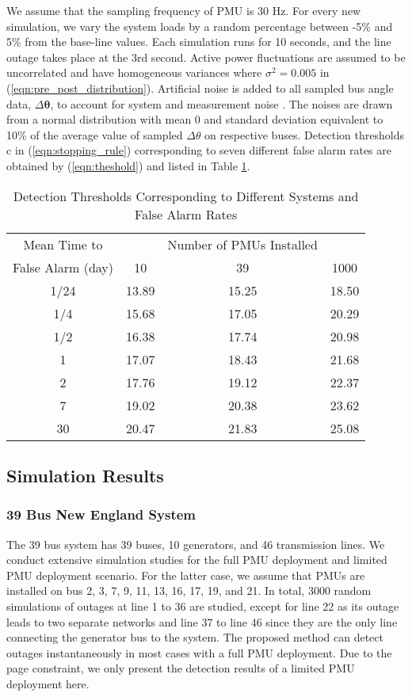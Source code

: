 We assume that the sampling frequency of PMU is 30 Hz. For every new simulation, we vary the system loads by a random percentage between -5\% and 5\% from the base-line values. Each simulation runs for 10 seconds, and the line outage takes place at the 3rd second. Active power fluctuations are assumed to be uncorrelated and have homogeneous variances where $\sigma^2 = 0.005$ in (\ref{eqn:pre_post_distribution}). Artificial noise is added to all sampled bus angle data, $\Delta \boldsymbol{\theta}$, to account for system and measurement noise \cite{Brown2016}. The noises are drawn from a normal distribution with mean $0$ and standard deviation equivalent to 10\% of the average value of sampled $\Delta{\theta}$ on respective buses. Detection thresholds c in (\ref{eqn:stopping_rule}) corresponding to seven different false alarm rates are obtained by (\ref{eqn:theshold}) and listed in Table \ref{tab:thresholds}. 
\begin{table}
\caption{Detection Thresholds Corresponding to Different Systems and False Alarm Rates}
\label{tab:thresholds}
\centering
\begin{tabular}{cccc}
\hline
\hline
Mean Time to  && Number of PMUs Installed\\
False Alarm (day) & 10 & 39 & 1000 \\
\hline
1/24 & 13.89 & 15.25 & 18.50 \\
1/4 & 15.68 & 17.05 & 20.29 \\
1/2 & 16.38 & 17.74 & 20.98 \\
1 & 17.07 & 18.43 & 21.68 \\
2 & 17.76 & 19.12 & 22.37 \\
7 & 19.02 & 20.38 & 23.62 \\
30 & 20.47 & 21.83 & 25.08 \\
\hline
\end{tabular} 
\end{table}

\subsection{Simulation Results} 
\subsubsection{39 Bus New England System}
The 39 bus system has 39 buses, 10 generators, and 46 transmission lines. We conduct extensive simulation studies for the full PMU deployment and limited PMU deployment scenario. For the latter case, we assume that PMUs are installed on bus 2, 3, 7, 9, 11, 13, 16, 17, 19, and 21. In total, 3000 random simulations of outages at line 1 to 36 are studied, except for line 22 as its outage leads to two separate networks and line 37 to line 46 since they are the only line connecting the generator bus to the system. The proposed method can detect outages instantaneously in most cases with a full PMU deployment. Due to the page constraint, we only present the detection results of a limited PMU deployment here. 

